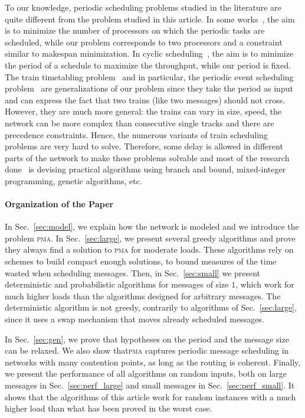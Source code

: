 \documentclass[a4paper,UKenglish,cleveref, autoref, thm-restate]{lipics-v2019}
\newcommand\pma{\textsc{pma}\xspace}
\begin{document}
 To our knowledge, periodic scheduling problems studied in the literature are quite different from the problem studied in this article. In some works~\cite{korst1991periodic,hanen1993cyclic}, the aim is to minimize the number of processors on which the periodic tasks are scheduled, while our problem corresponds to two processors and a constraint similar to makespan minimization. In cyclic scheduling~\cite{levner2010complexity}, the aim is to minimize the period of a schedule to maximize the throughput, while our period is fixed. The train timetabling problem~\cite{lusby2011railway} and in particular, the periodic event scheduling problem~\cite{serafini1989mathematical} are generalizations of our problem since they take the period as input and can express the fact that two trains (like two messages) should not cross. However, they are much more general: the trains can vary in size, speed, the network can be more complex than consecutive single tracks and there are precedence constraints. Hence, the numerous variants of train scheduling problems are very hard to solve. Therefore, some delay is allowed in different parts of the network to make these problems solvable and most of the research done~\cite{lusby2011railway} is devising practical algorithms using branch and bound, mixed-integer programming, genetic algorithms, etc. 
 

\paragraph*{Organization of the Paper}

In Sec.~\ref{sec:model}, we explain how the network is modeled and we introduce the problem \pma. In Sec.~\ref{sec:large}, we present several greedy algorithms and prove they always find a solution to \pma for moderate loads. 
These algorithms rely on schemes to build compact enough solutions, to bound measures of the time wasted when scheduling messages. Then, in Sec.~\ref{sec:small} we present deterministic and probabilistic algorithms for messages of size $1$, which work for much higher loads than the algorithms designed for arbitrary messages. The deterministic algorithm is not greedy, contrarily to algorithms of Sec.~\ref{sec:large}, since it uses a swap mechanism that moves already scheduled messages. 


In Sec.~\ref{sec:gen}, we prove that hypotheses on the period and the message size can be relaxed. We also show that\pma captures periodic message scheduling in networks with many contention points, as long as the routing is coherent.
Finally, we present the performance of all algorithms on random inputs, both on large messages in Sec.~\ref{sec:perf_large} and small messages in Sec.~\ref{sec:perf_small}.
It shows that the algorithms of this article work for random instances with a much higher load than what has been proved in the worst case.
\end{document}
